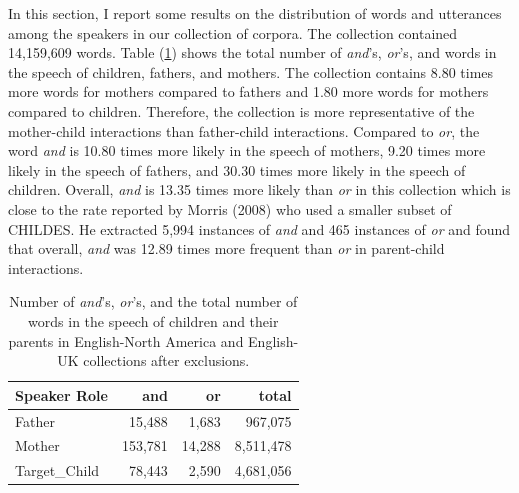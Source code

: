 \documentclass[floatsintext,man]{apa6}
\theoremstyle{definition}
\theoremstyle{definition}
\theoremstyle{definition}
\theoremstyle{remark}
\begin{document}
In this section, I report some results on the distribution of words and
utterances among the speakers in our collection of corpora. The
collection contained 14,159,609 words. Table (\ref{tab:countTable})
shows the total number of \emph{and}'s, \emph{or}'s, and words in the
speech of children, fathers, and mothers. The collection contains 8.80
times more words for mothers compared to fathers and 1.80 more words for
mothers compared to children. Therefore, the collection is more
representative of the mother-child interactions than father-child
interactions. Compared to \emph{or}, the word \emph{and} is 10.80 times
more likely in the speech of mothers, 9.20 times more likely in the
speech of fathers, and 30.30 times more likely in the speech of
children. Overall, \emph{and} is 13.35 times more likely than \emph{or}
in this collection which is close to the rate reported by Morris (2008)
who used a smaller subset of CHILDES. He extracted 5,994 instances of
\emph{and} and 465 instances of \emph{or} and found that overall,
\emph{and} was 12.89 times more frequent than \emph{or} in parent-child
interactions.

\begin{table}

\caption{\label{tab:countTable}Number of \textit{and}'s, \textit{or}'s, and the total number of words in the speech of children and their parents in English-North America and English-UK collections after exclusions.}
\centering
\begin{tabular}[t]{l|r|r|r}
\hline
Speaker Role & and & or & total\\
\hline
Father & 15,488 & 1,683 & 967,075\\
\hline
Mother & 153,781 & 14,288 & 8,511,478\\
\hline
Target\_Child & 78,443 & 2,590 & 4,681,056\\
\hline
\end{tabular}
\end{table}
\end{document}
